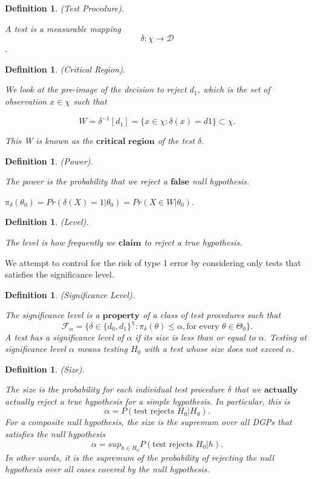 \documentclass[twoside]{article}
\newtheorem{definition}[theorem]{Definition}
\begin{document}
\begin{definition}(Test Procedure).

A test is a measurable mapping $$\delta: \chi \rightarrow \mathcal{D}$$.

\end{definition}


\begin{definition}
(Critical Region). 

We look at the pre-image of the decision to reject $d_1$, which is the set of observation $x \in \chi$ such that

$$W = \delta^{-1}[d_1] = \{x \in \chi: \delta(x) = d1 \} \subset \chi.$$

This W is known as the $\textbf{critical region}$ of the test $\delta$.
\end{definition}

\begin{definition}
(Power).

The power is the probability that we reject a $\textbf{false}$ null hypothesis. 

$\pi_{\delta}(\theta_0) = Pr(\delta(X) = 1| \theta_0) = Pr(X \in W|\theta_0)$.
\end{definition}


\begin{definition}
(Level).

The level is how frequently we $\textbf{claim}$ to reject a true hypothesis.
\end{definition}

We attempt to control for the risk of type 1 error by considering only tests that satisfies the significance level. 

\begin{definition}
(Significance Level). 

The significance level is a $\textbf{property}$ of a class of test procedures such that
$$
\mathcal{F}_{\alpha} = \{\delta \in \{d_0, d_1\}^{\chi}: \pi_{\delta}(\theta) \leq \alpha, \text{for every } \theta \in \Theta_0\}.
$$
A test has a significance level of $\alpha$ if its size is less than or equal to $\alpha$. Testing at significance level $\alpha$ means testing $H_0$ with a test whose size does not exceed $\alpha$.
\end{definition}

\begin{definition}
(Size).

The size is the probability for each individual test procedure $\delta$ that we $\textbf{actually}$ actually reject a true hypothesis for a simple hypothesis. In particular, this is
$$
\alpha = P(\text{test rejects }H_0|H_0).
$$
For a composite null hypothesis, the size is the supremum over all DGPs that satisfies the null hypothesis
$$
\alpha = sup_{h \in H_0}P(\text{test rejects } H_0| h).
$$
In other words, it is the supremum of the probability of rejecting the null hypothesis over all cases covered by the null hypothesis.
\end{definition}
\end{document}
